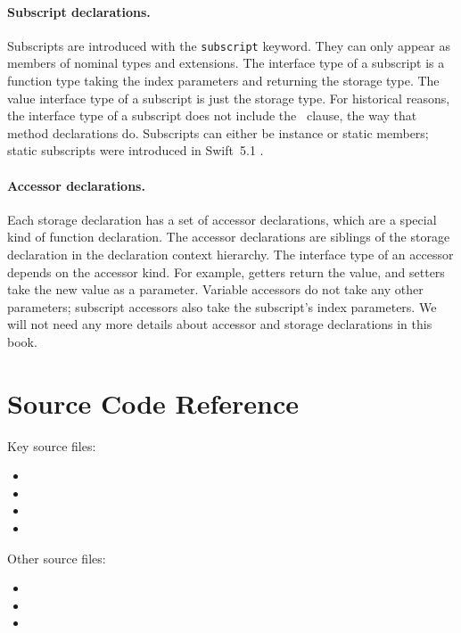 \documentclass[../generics]{subfiles}
\begin{document}
\paragraph{Subscript declarations.} Subscripts are introduced with the \texttt{subscript} keyword. They can only appear as members of nominal types and extensions. The interface type of a subscript is a function type taking the index parameters and returning the storage type. The value interface type of a subscript is just the storage type. For historical reasons, the interface type of a subscript does not include the \tSelf\ clause, the way that method declarations do. Subscripts can either be instance or static members; static subscripts were introduced in Swift~5.1 \cite{se0254}.

\paragraph{Accessor declarations.}
Each storage declaration has a set of accessor declarations, which are a special kind of function declaration. The accessor declarations are siblings of the storage declaration in the declaration context hierarchy. The interface type of an accessor depends on the accessor kind. For example, getters return the value, and setters take the new value as a parameter. Variable accessors do not take any other parameters; subscript accessors also take the subscript's index parameters. We will not need any more details about accessor and storage declarations in this book.

\section{Source Code Reference}\label{src:declarations}

Key source files:
\begin{itemize}
\item {}
\item {}
\item {}
\item {}
\end{itemize}
Other source files:
\begin{itemize}
\item {}
\item {}
\item {}
\end{itemize}
\end{document}
